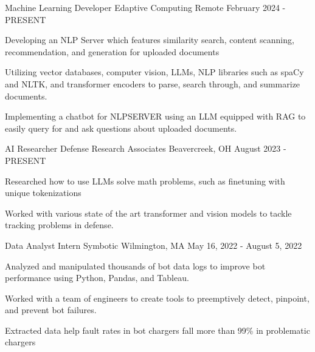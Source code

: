 
\begin{cventries}

  \cventry
  {Machine Learning Developer} %
  {Edaptive Computing} %
  {Remote} %
  {February 2024 - PRESENT} %
  {
    \begin{cvitems} %
      \item {Developing an NLP Server which features similarity search, content scanning, recommendation, and generation for uploaded documents}
      \item {Utilizing vector databases, computer vision, LLMs, NLP libraries such as spaCy and NLTK, and transformer encoders to parse, search through, and summarize documents.}
      \item {Implementing a chatbot for NLPSERVER using an LLM equipped with RAG to easily query for and ask questions about uploaded documents.}
    \end{cvitems}
  }

  \cventry
      {AI Researcher} %
      {Defense Research Associates} %
      {Beavercreek, OH} %
      {August 2023 - PRESENT} %
      {
        \begin{cvitems} %
          \item {Researched how to use LLMs solve math problems, such as finetuning with unique tokenizations}
          \item {Worked with various state of the art transformer and vision models to tackle tracking problems in defense.}
          \end{cvitems}
      }

  \cventry
      {Data Analyst Intern} %
      {Symbotic} %
      {Wilmington, MA} %
      {May 16, 2022 - August 5, 2022} %
      {
        \begin{cvitems} %
          \item {Analyzed and manipulated thousands of bot data logs to improve bot performance using Python, Pandas, and Tableau.}
          \item {Worked with a team of engineers to create tools to preemptively detect, pinpoint, and prevent bot failures.}
          \item {Extracted data help fault rates in bot chargers fall more than 99\% in problematic chargers}
        \end{cvitems}
      }


\end{cventries}

